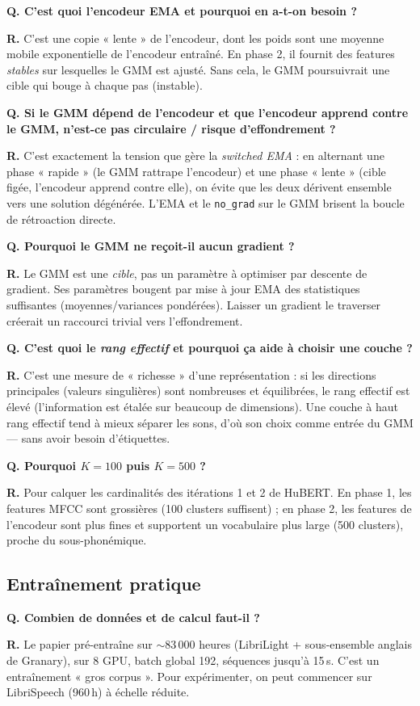 \documentclass[11pt,a4paper]{article}
\newcommand{\faq}[2]{%
  \par\medskip
  \begin{faqbox}
  \textbf{Q. #1}\par\smallskip
  \textbf{R.} #2
  \end{faqbox}
}
\newcommand{\code}[1]{\texttt{#1}}
\begin{document}
\faq{C'est quoi l'encodeur EMA et pourquoi en a-t-on besoin ?}{%
C'est une copie « lente » de l'encodeur, dont les poids sont une moyenne
mobile exponentielle de l'encodeur entraîné. En phase 2, il fournit des
features \emph{stables} sur lesquelles le GMM est ajusté. Sans cela, le GMM
poursuivrait une cible qui bouge à chaque pas (instable).}

\faq{Si le GMM dépend de l'encodeur et que l'encodeur apprend contre le
GMM, n'est-ce pas circulaire / risque d'effondrement ?}{%
C'est exactement la tension que gère la \emph{switched EMA} : en alternant
une phase « rapide » (le GMM rattrape l'encodeur) et une phase « lente »
(cible figée, l'encodeur apprend contre elle), on évite que les deux
dérivent ensemble vers une solution dégénérée. L'EMA et le \code{no\_grad}
sur le GMM brisent la boucle de rétroaction directe.}

\faq{Pourquoi le GMM ne reçoit-il aucun gradient ?}{%
Le GMM est une \emph{cible}, pas un paramètre à optimiser par descente de
gradient. Ses paramètres bougent par mise à jour EMA des statistiques
suffisantes (moyennes/variances pondérées). Laisser un gradient le
traverser créerait un raccourci trivial vers l'effondrement.}

\faq{C'est quoi le \emph{rang effectif} et pourquoi ça aide à choisir une
couche ?}{%
C'est une mesure de « richesse » d'une représentation : si les directions
principales (valeurs singulières) sont nombreuses et équilibrées, le rang
effectif est élevé (l'information est étalée sur beaucoup de dimensions).
Une couche à haut rang effectif tend à mieux séparer les sons, d'où son
choix comme entrée du GMM --- sans avoir besoin d'étiquettes.}

\faq{Pourquoi $K=100$ puis $K=500$ ?}{%
Pour calquer les cardinalités des itérations 1 et 2 de HuBERT. En phase 1,
les features MFCC sont grossières (100 clusters suffisent) ; en phase 2,
les features de l'encodeur sont plus fines et supportent un vocabulaire
plus large (500 clusters), proche du sous-phonémique.}

\subsection{Entraînement pratique}

\faq{Combien de données et de calcul faut-il ?}{%
Le papier pré-entraîne sur $\sim$83\,000 heures (LibriLight + sous-ensemble
anglais de Granary), sur 8 GPU, batch global 192, séquences jusqu'à 15\,s.
C'est un entraînement « gros corpus ». Pour expérimenter, on peut commencer
sur LibriSpeech (960\,h) à échelle réduite.}
\end{document}
